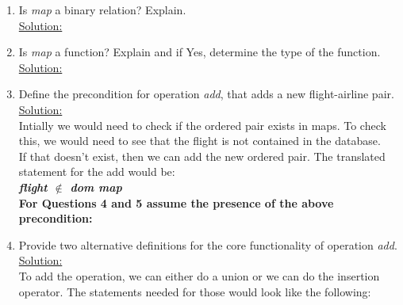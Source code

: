 \begin{enumerate}
  \item Is \emph{map} a binary relation? Explain.\\
  \noindent\underline{Solution:}\\
  \item Is \emph{map} a function? Explain and if Yes, determine the type of the function.\\
  \noindent\underline{Solution:}\\
  \item Define the precondition for operation \emph{add}, that adds a new flight-airline pair.\\
  \noindent\underline{Solution:}\\ Intially we would need to check if the ordered pair exists in maps. To check this, we would need to see that the flight is not contained in the database.\\
  If that doesn't exist, then we can add the new ordered pair. The translated statement for the add would be:\\
  \textbf{\emph{flight $\notin$ dom map}}\\
  \textbf{For Questions 4 and 5 assume the presence of the above precondition:}\\
  \item Provide two alternative definitions for the core functionality of operation \emph{add}.\\
  \noindent\underline{Solution:}\\ To add the operation, we can either do a union or we can do the insertion operator. The statements needed for those would look like the following:\
\end{enumerate}
